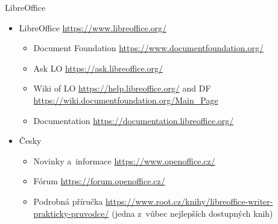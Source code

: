 \documentclass[compress, xelatex, 11pt, xcolor=svgnames, aspectratio=169,
	hyperref={
		bookmarks=true,
		unicode=true,
		colorlinks=true,
		pdftitle={Linux, command line and MetaCentrum},
		plainpages=false,
		pdfauthor={Vojtech Zeisek},
		pdfsubject={Course about use of Linux command line, writing shell scripts and using MetaCentrum of CESNET},
		pdfcreator={XeLaTeX},
		pdfkeywords={Linux, GNU, BASH, shell, command line, MetaCentrum},
		linkcolor=DarkRed, %
		anchorcolor=DarkBlue, %
		citecolor=Indigo, %
		filecolor=NavyBlue, %
		menucolor=DarkMagenta, %
		urlcolor=DarkBlue, %
		},
	url={hyphens, lowtilde} %
	]{beamer}
\begin{document}
\begin{frame}{LibreOffice}
	\begin{itemize}
		\item LibreOffice \url{https://www.libreoffice.org/}
		\begin{itemize}
			\item Document Foundation \url{https://www.documentfoundation.org/}
			\item Ask LO \url{https://ask.libreoffice.org/}
			\item Wiki of LO \url{https://help.libreoffice.org/} and DF \url{https://wiki.documentfoundation.org/Main_Page}
			\item Documentation \url{https://documentation.libreoffice.org/}
		\end{itemize}
		\item Česky
		\begin{itemize}
			\item Novinky a~informace \url{https://www.openoffice.cz/}
			\item Fórum \url{https://forum.openoffice.cz/}
			\item Podrobná příručka \url{https://www.root.cz/knihy/libreoffice-writer-prakticky-pruvodce/} (jedna z~vůbec nejlepších dostupných knih)
		\end{itemize}
	\end{itemize}
\end{frame}
\end{document}
